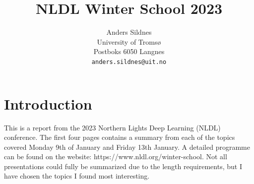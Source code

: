 \documentclass[10pt,twocolumn,letterpaper]{article}
\begin{document}
\title{NLDL Winter School 2023}

\author{Anders Sildnes\\
University of Tromsø\\
Postboks 6050 Langnes\\
{\tt\small anders.sildnes@uit.no}
}
\maketitle


\section{Introduction}
\label{sec:intro}
This is a report from the 2023 Northern Lights Deep Learning (NLDL) conference. The first four pages contains a summary from each of the topics covered Monday 9th of January and Friday 13th January. A detailed programme can be found on the website: https://www.nldl.org/winter-school. Not all presentations could fully be summarized due to the length requirements, but I have chosen the topics I found most interesting.
\end{document}
